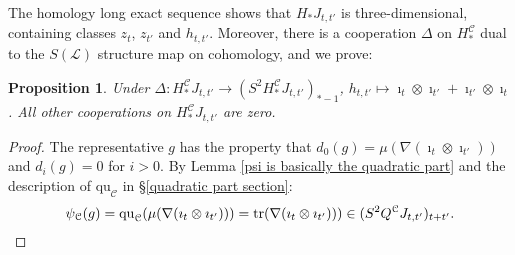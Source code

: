 \documentclass[11pt]{amsart} \renewcommand{\baselinestretch}{1.2}
\theoremstyle{plain}
\newtheorem{prop}[thm]{Proposition}
\theoremstyle{definition}
\DeclareMathOperator{\trace}{tr}
\renewcommand{\to}{\longrightarrow}
\newcommand{\scrL}{\mathscr{L}}
\newcommand{\calc}{\mathcal{C}}
\newcommand{\LieOperad}{{\scrL}}
\newcommand{\quadratic}{\mathrm{qu}}
\newcommand{\Nabla}{\nabla}
\renewcommand{\mapsto}{\longmapsto}
\begin{document}
\begin{Operations on the Bousfield-Kan spectral sequence}
The homology long exact sequence shows that $H_*J_{t,t'}$ is three-dimensional, containing classes $ z_t$, $ z_{t'}$ and $h_{t,t'}$. Moreover, there is a cooperation $\Delta$ on $H_{*}^{\calc}$ dual to the $S(\LieOperad)$ structure map on cohomology, and we prove:
\begin{prop}
\label{prop on three cell}
Under $\Delta:H_*^{\calc}J_{t,t'}\to (S^2H_*^{\calc}J_{t,t'})_{*-1}$, $h_{t,t'}\mapsto\imath_t\otimes\imath_{t'}+\imath_{t'}\otimes\imath_t$. All other cooperations on $H_*^{\calc}J_{t,t'}$ are zero.
\end{prop}
\begin{proof}
The representative $g$ has the property that $d_0(g)=\mu(\Nabla(\imath_t\otimes\imath_{t'}))$ and $d_i(g)=0$ for $i>0$. By Lemma \ref{psi is basically the quadratic part} and the description of $\quadratic_\calc$ in \S\ref{quadratic part section}:
\[\psi_\calc(g)=
\quadratic_\calc(\mu(\Nabla(\imath_t\otimes\imath_{t'})))=
\trace(\Nabla(\imath_t\otimes\imath_{t'})))\in (S^2Q^\calc J_{t,t'})_{t+t'}.\qedhere\]
\end{proof}


\end{Operations on the Bousfield-Kan spectral sequence}
\end{document}
